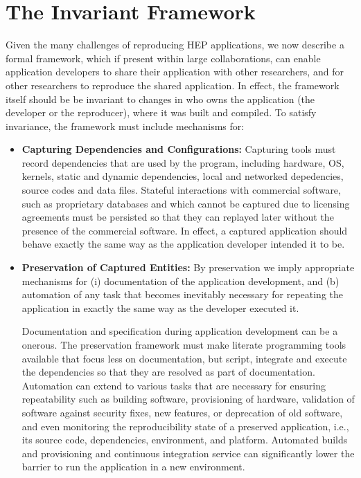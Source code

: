 \section{The Invariant Framework}

Given the many challenges of reproducing HEP applications, we now describe a formal framework, which if present within large collaborations, can enable application developers to share their 
application with other researchers, and for other researchers to reproduce the shared application. In effect, the framework itself should be 
be invariant to changes in who owns the application (the developer or the reproducer), where it was built and compiled. To satisfy invariance, the framework must include mechanisms for:

\begin{itemize}

\item {\bf Capturing Dependencies and Configurations:} Capturing tools must record dependencies that are used by the program, including hardware, OS, kernels, static and dynamic dependencies, local and networked depedencies, source codes and data files. Stateful interactions with commercial software, such as proprietary databases and which cannot be captured due to licensing agreements must be persisted so that they can replayed later without the presence of the commercial software.  In effect, a captured application should behave exactly the same way as the application developer intended it to be. 

\item{\bf Preservation of Captured Entities:} By preservation we imply appropriate mechanisms for (i) documentation of the application development, and (b) automation of any task that becomes inevitably 
necessary for repeating the application in exactly the same way as the developer executed it. 
 
Documentation and specification during application development can be a onerous. The preservation framework must make literate programming tools available that 
focus less on documentation, but script, integrate and execute the dependencies so that they are resolved as part of documentation. 
Automation can extend to various tasks that are necessary for ensuring repeatability such as building software, provisioning of hardware, 
validation of software against security fixes, new features, or deprecation of old software, and even monitoring the reproducibility state of a preserved application, i.e., its source code, dependencies, environment, and platform.
Automated builds and provisioning and continuous integration service can significantly lower the barrier to run the application in a new environment. 


\end{itemize}
